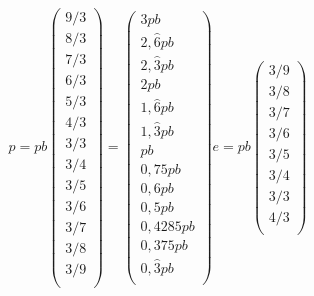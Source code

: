 \documentclass[a4paper, 11pt, titlepage]{article}
\begin{document}
        \[
            p = pb
            \begin{pmatrix}
                9/3 \\ 
                8/3 \\ 
                7/3 \\ 
                6/3 \\ 
                5/3 \\ 
                4/3 \\ 
                3/3 \\ 
                3/4 \\ 
                3/5 \\ 
                3/6 \\ 
                3/7 \\ 
                3/8 \\ 
                3/9 \\ 
            \end{pmatrix}
            = 
            \begin{pmatrix}
                3pb \\ 
                2,\widehat{6}pb \\ 
                2,\widehat{3}pb \\ 
                2pb \\ 
                1,\widehat{6}pb \\ 
                1,\widehat{3}pb \\ 
                pb \\ 
                0,75pb \\ 
                0,6pb \\ 
                0,5pb \\ 
                0,4285pb \\ 
                0,375pb \\ 
                0,\widehat{3}pb \\ 
            \end{pmatrix}
            e = pb
            \begin{pmatrix}
                3/9 \\ 
                3/8 \\ 
                3/7 \\ 
                3/6 \\ 
                3/5 \\ 
                3/4 \\ 
                3/3 \\ 
                4/3 \\ 

\end{pmatrix}\]
\end{document}
